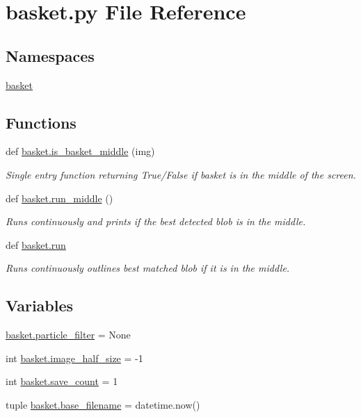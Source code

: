\section{basket.\+py File Reference}
\label{basket_8py}
\subsection*{Namespaces}
\begin{DoxyCompactItemize}
\item 
 \hyperlink{namespacebasket}{basket}
\end{DoxyCompactItemize}
\subsection*{Functions}
\begin{DoxyCompactItemize}
\item 
def \hyperlink{namespacebasket_a6244ca5fd7cf7706c81e45e270087d17}{basket.\+is\+\_\+basket\+\_\+middle} (img)
\begin{DoxyCompactList}\small\item\em Single entry function returning True/\+False if basket is in the middle of the screen. \end{DoxyCompactList}\item 
def \hyperlink{namespacebasket_a0cb50ef447247bf29a40cbdfcd275bc0}{basket.\+run\+\_\+middle} ()
\begin{DoxyCompactList}\small\item\em Runs continuously and prints if the best detected blob is in the middle. \end{DoxyCompactList}\item 
def \hyperlink{namespacebasket_a00c6a996da6d264c30c7b6c710cacddc}{basket.\+run}
\begin{DoxyCompactList}\small\item\em Runs continuously outlines best matched blob if it is in the middle. \end{DoxyCompactList}\end{DoxyCompactItemize}
\subsection*{Variables}
\begin{DoxyCompactItemize}
\item 
\hyperlink{namespacebasket_ae8e523df739d65470eb5eba16867f329}{basket.\+particle\+\_\+filter} = None
\item 
int \hyperlink{namespacebasket_a3c352b285b29250f904de2d4ad7fddaa}{basket.\+image\+\_\+half\+\_\+size} = -\/1
\item 
int \hyperlink{namespacebasket_a3d020674941ec4faf6734391ca082c40}{basket.\+save\+\_\+count} = 1
\item 
tuple \hyperlink{namespacebasket_aa3007fa12430ca814f5bf5890bb2fb0f}{basket.\+base\+\_\+filename} = datetime.\+now()
\end{DoxyCompactItemize}
